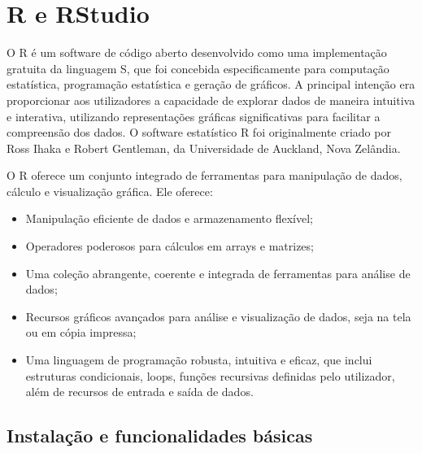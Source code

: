 \documentclass[
]{book}
\providecommand{\tightlist}{%
  \setlength{\itemsep}{0pt}\setlength{\parskip}{0pt}}
\begin{document}
\chapter{R e RStudio}\label{r-e-rstudio}

O R é um software de código aberto desenvolvido como uma implementação
gratuita da linguagem S, que foi concebida especificamente para
computação estatística, programação estatística e geração de gráficos. A
principal intenção era proporcionar aos utilizadores a capacidade de
explorar dados de maneira intuitiva e interativa, utilizando
representações gráficas significativas para facilitar a compreensão dos
dados. O software estatístico R foi originalmente criado por Ross Ihaka
e Robert Gentleman, da Universidade de Auckland, Nova Zelândia.

O R oferece um conjunto integrado de ferramentas para manipulação de
dados, cálculo e visualização gráfica. Ele oferece:

\begin{itemize}
\tightlist
\item
  Manipulação eficiente de dados e armazenamento flexível;
\item
  Operadores poderosos para cálculos em arrays e matrizes;
\item
  Uma coleção abrangente, coerente e integrada de ferramentas para
  análise de dados;
\item
  Recursos gráficos avançados para análise e visualização de dados,
  seja na tela ou em cópia impressa;
\item
  Uma linguagem de programação robusta, intuitiva e eficaz, que inclui
  estruturas condicionais, loops, funções recursivas definidas pelo
  utilizador, além de recursos de entrada e saída de dados.
\end{itemize}

\section{Instalação e funcionalidades básicas}\label{instalauxe7uxe3o-e-funcionalidades-buxe1sicas}
\end{document}
